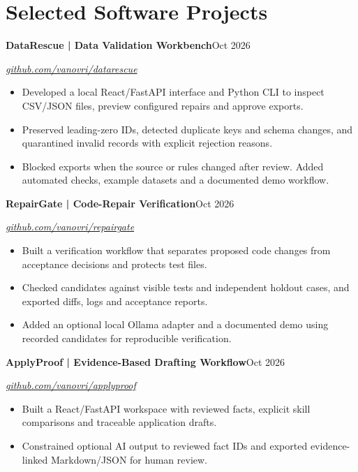 \documentclass[11pt,a4paper]{article}
\newcommand{\entry}[3]{\Needspace{4\baselineskip}\textbf{#1}\hfill #2\par\textit{#3}\par}
\begin{document}
\section{Selected Software Projects}
\entry{DataRescue | Data Validation Workbench}{Oct 2026}{\href{https://github.com/vanovri/datarescue}{github.com/vanovri/datarescue}}
\begin{itemize}
\item Developed a local React/FastAPI interface and Python CLI to inspect CSV/JSON files, preview configured repairs and approve exports.
\item Preserved leading-zero IDs, detected duplicate keys and schema changes, and quarantined invalid records with explicit rejection reasons.
\item Blocked exports when the source or rules changed after review. Added automated checks, example datasets and a documented demo workflow.
\end{itemize}
\entry{RepairGate | Code-Repair Verification}{Oct 2026}{\href{https://github.com/vanovri/repairgate}{github.com/vanovri/repairgate}}
\begin{itemize}
\item Built a verification workflow that separates proposed code changes from acceptance decisions and protects test files.
\item Checked candidates against visible tests and independent holdout cases, and exported diffs, logs and acceptance reports.
\item Added an optional local Ollama adapter and a documented demo using recorded candidates for reproducible verification.
\end{itemize}
\entry{ApplyProof | Evidence-Based Drafting Workflow}{Oct 2026}{\href{https://github.com/vanovri/applyproof}{github.com/vanovri/applyproof}}
\begin{itemize}
\item Built a React/FastAPI workspace with reviewed facts, explicit skill comparisons and traceable application drafts.
\item Constrained optional AI output to reviewed fact IDs and exported evidence-linked Markdown/JSON for human review.
\end{itemize}
\newpage
\end{document}
